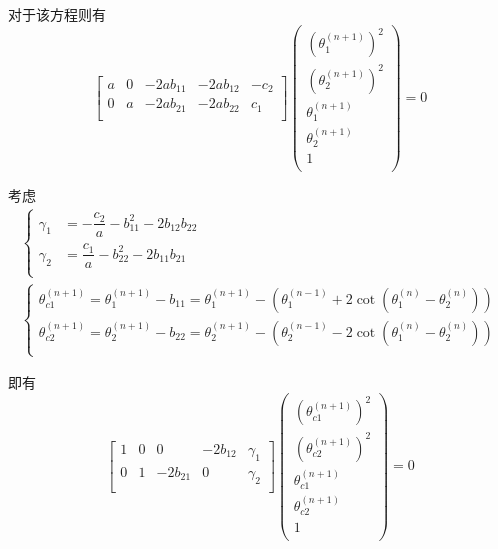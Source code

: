 \documentclass[UTF8]{ctexart}
\begin{document}
				对于该方程则有
				\begin{equation}
					\left[
						\begin{matrix}
							a & 0 & -2 a b_{11} & -2 a b_{12} & -c_{2}    \\
							0 & a & -2 a b_{21} & -2 a b_{22} & c_{1}    \\
						\end{matrix}
					\right]
					\left(
						\begin{matrix}
							\left(\theta_{1}^{(n + 1)}\right)^2     \\
							\left(\theta_{2}^{(n + 1)}\right)^2     \\
							\theta_{1}^{(n + 1)}         \\
							\theta_{2}^{(n + 1)}         \\
							1                            \\
						\end{matrix}
					\right)
					=
					0
				\end{equation}

				考虑
				\begin{gather}
					\begin{cases}
						\gamma_{1} & = - \dfrac{c_{2}}{a} - b_{11}^{2} - 2 b_{12} b_{22}    \\
						\gamma_{2} & =   \dfrac{c_{1}}{a} - b_{22}^{2} - 2 b_{11} b_{21}    \\
					\end{cases}
					\\
					\begin{cases}
						\theta_{c1}^{(n + 1)} = \theta_{1}^{(n + 1)} - b_{11} = \theta_{1}^{(n + 1)} - \left(\theta_{1}^{(n-1)} + 2 \cot(\theta_{1}^{(n)} - \theta_2^{(n)})\right)   \\
						\theta_{c2}^{(n + 1)} = \theta_{2}^{(n + 1)} - b_{22} = \theta_{2}^{(n + 1)} - \left(\theta_{2}^{(n-1)} - 2 \cot(\theta_{1}^{(n)} - \theta_2^{(n)})\right)   \\
					\end{cases}
					\label{eq: theta c1}
				\end{gather}

				即有
				\begin{equation}
					\left[
						\begin{matrix}
							1 & 0 &  0            & -2 b_{12} & \gamma_{1}   \\
							0 & 1 & -2 b_{21} &  0            & \gamma_{2}   \\
						\end{matrix}
					\right]
					\left(
						\begin{matrix}
							\left(\theta_{c1}^{(n + 1)}\right)^2     \\
							\left(\theta_{c2}^{(n + 1)}\right)^2     \\
							\theta_{c1}^{(n + 1)}                    \\
							\theta_{c2}^{(n + 1)}                    \\
							1                                        \\
						\end{matrix}
					\right)
					=
					0
				\end{equation}
\end{document}
